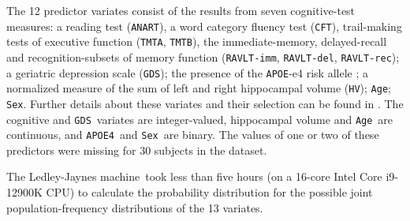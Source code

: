 \documentclass[utf8]{FrontiersinHarvard_mod} %
\renewcommand*{\|}[1][]{\nonscript\:#1\vert\nonscript\:\mathopen{}}
\newcommand*{\age}{\texttt{Age}}
\newcommand*{\sex}{\texttt{Sex}}
\newcommand*{\apoe}{\texttt{APOE4}}
\newcommand*{\hv}{\texttt{HV}}
\newcommand*{\anart}{\texttt{ANART}}
\newcommand*{\cft}{\texttt{CFT}}
\newcommand*{\gds}{\texttt{GDS}}
\newcommand*{\ravltimm}{\texttt{RAVLT-imm}}
\newcommand*{\ravltdel}{\texttt{RAVLT-del}}
\newcommand*{\ravltrec}{\texttt{RAVLT-rec}}
\newcommand*{\tmta}{\texttt{TMTA}}
\newcommand*{\tmtb}{\texttt{TMTB}}
\newcommand*{\ljm}{Ledley-Jaynes machine}
\begin{document}

The 12 predictor variates consist of the results from seven cognitive-test measures: a reading test (\anart), a word category fluency test (\cft), trail-making tests of executive function (\tmta, \tmtb), the immediate-memory, delayed-recall and recognition-subsets of memory function (\ravltimm, \ravltdel, \ravltrec); a geriatric depression scale (\gds); the presence of the \texttt{APOE}-e4 risk allele \citep{liuetal2013}; a normalized measure of the sum of left and right hippocampal volume (\hv); \age; \sex. Further details about these variates and their selection can be found in \citet{ryeetal2022}. The cognitive and \gds\ variates are integer-valued, hippocampal volume and \age\ are continuous, and \apoe\ and \sex\ are binary. The values of one or two of these predictors were missing for 30 subjects in the dataset.


The \ljm\ took less than five hours (on a 16-core Intel Core i9-12900K CPU) to calculate the probability distribution for the possible joint population-frequency distributions of the 13 variates.
\end{document}
